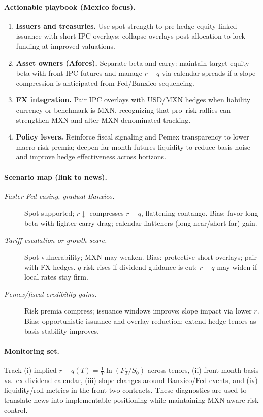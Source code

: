 \documentclass[11pt,a4paper]{article} %
\begin{document}
\paragraph{Actionable playbook (Mexico focus).}
\begin{enumerate}
  \item \textbf{Issuers and treasuries.} Use spot strength to pre-hedge equity-linked issuance with short IPC overlays; collapse overlays post-allocation to lock funding at improved valuations.
  \item \textbf{Asset owners (Afores).} Separate beta and carry: maintain target equity beta with front IPC futures and manage \(r-q\) via calendar spreads if a slope compression is anticipated from Fed/Banxico sequencing.
  \item \textbf{FX integration.} Pair IPC overlays with USD/MXN hedges when liability currency or benchmark is MXN, recognizing that pro–risk rallies can strengthen MXN and alter MXN-denominated tracking.
  \item \textbf{Policy levers.} Reinforce fiscal signaling and Pemex transparency to lower macro risk premia; deepen far-month futures liquidity to reduce basis noise and improve hedge effectiveness across horizons.
\end{enumerate}

\paragraph{Scenario map (link to news).}
\begin{description}
  \item[\textit{Faster Fed easing, gradual Banxico.}] Spot supported; \(r\downarrow\) compresses \(r-q\), flattening contango. Bias: favor long beta with lighter carry drag; calendar flatteners (long near/short far) gain.
  \item[\textit{Tariff escalation or growth scare.}] Spot vulnerability; MXN may weaken. Bias: protective short overlays; pair with FX hedges. \(q\) risk rises if dividend guidance is cut; \(r-q\) may widen if local rates stay firm.
  \item[\textit{Pemex/fiscal credibility gains.}] Risk premia compress; issuance windows improve; slope impact via lower \(r\). Bias: opportunistic issuance and overlay reduction; extend hedge tenors as basis stability improves.
\end{description}

\paragraph{Monitoring set.}
Track (i) implied \(r-q(T)=\frac{1}{T}\ln(F_T/S_0)\) across tenors, (ii) front-month basis vs.\ ex-dividend calendar, (iii) slope changes around Banxico/Fed events, and (iv) liquidity/roll metrics in the front two contracts. These diagnostics are used to translate news into implementable positioning while maintaining MXN-aware risk control.
\end{document}
